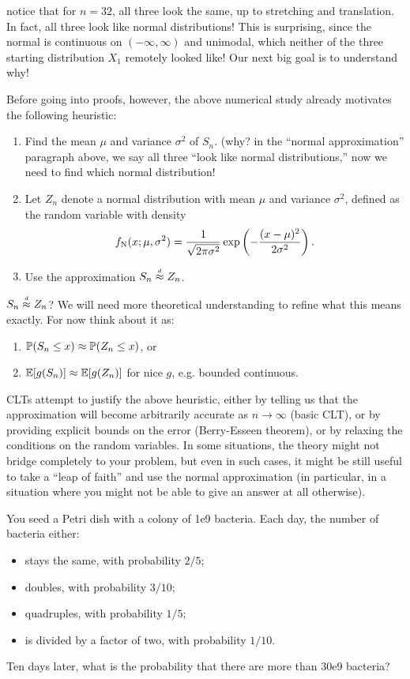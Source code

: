 \documentclass{article}
\begin{document}
 notice that for $n=32$, all three look the same, up to stretching and translation. In fact, all three look like normal distributions! This is surprising, since the normal is continuous on $(-\infty, \infty)$ and unimodal, which neither of the three starting distribution $X_1$ remotely looked like! Our next big goal is to understand why!

 Before going into proofs, however, the above numerical study already motivates the following heuristic:
\begin{enumerate}
	\item Find the mean $\mu$ and variance $\sigma^2$ of $S_n$. (why? in the ``normal approximation'' paragraph above, we say all three ``look like normal distributions,'' now we need to find which normal distribution!
	\item Let $Z_n$ denote a normal distribution with mean $\mu$ and variance $\sigma^2$, defined as the random variable with density
	\[ \normald(x; \mu, \sigma^2) = \frac{1}{\sqrt{2 \pi \sigma^2}} \exp\left(-\frac{(x-\mu)^2}{2\sigma^2}\right). \]
	\item Use the approximation $S_n \dapprox Z_n$.
\end{enumerate}

 $S_n \dapprox Z_n$? We will need more theoretical understanding to refine what this means exactly. For now think about it as:
\begin{enumerate}
	\item $\P(S_n \le x) \approx \P(Z_n \le x)$, or
	\item $\E [ g(S_n) ] \approx \E [ g(Z_n) ]$ for nice $g$, e.g. bounded continuous.
\end{enumerate}

 CLTs attempt to justify the above heuristic, either by telling us that the approximation will become arbitrarily accurate as $n \to \infty$ (basic CLT), or by providing explicit bounds on the error (Berry-Esseen theorem), or by relaxing the conditions on the random variables. In some situations, the theory might not bridge completely to your problem, but even in such cases, it might be still useful to take a ``leap of faith'' and use the normal approximation (in particular, in a situation where you might not be able to give an answer at all otherwise).

 You seed a Petri dish with a colony of 1e9 bacteria. Each day, the number of bacteria  either:
\begin{itemize}
	\item stays the same, with probability $2/5$;
	\item doubles, with probability $3/10$;
	\item quadruples, with probability $1/5$;
	\item is divided by a factor of two, with probability $1/10$.
\end{itemize}
Ten days later, what is the probability that there are more than 30e9 bacteria? 
\end{document}
